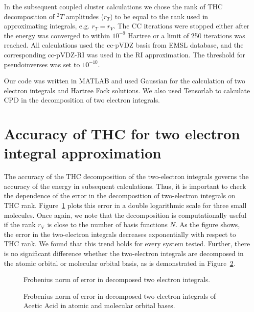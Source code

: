 In the subsequent coupled cluster calculations we chose the rank of THC 
decomposition of ${}^2T$ amplitudes ($r_{T}$) to be equal to the rank 
used in approximating integrals, e.g. $r_{T} = r_{V}$. 
The CC iterations were stopped either after the energy was converged to within 
$10^{-9}$ Hartree or a limit of 250 iterations 
was reached. All calculations used the cc-pVDZ basis from EMSL
database,\cite{schuchardt2007basis} and the corresponding cc-pVDZ-RI
was used in the RI approximation. The threshold for pseudoinverses was set to 
$10^{-10}$.

Our code was written in MATLAB\cite{matlab} and used Gaussian\cite{gaussian} 
for the calculation of two electron integrals and Hartree Fock solutions. We 
also used Tensorlab\cite{vervliettensorlab} to calculate CPD in the 
decomposition of two electron integrals.

\section{Accuracy of THC for two electron integral approximation}
The accuracy of the THC decomposition of the two-electron integrals governs the
accuracy of the energy in subsequent calculations. Thus, it is important to 
check the dependence of the error in the decomposition of
two-electron integrals on THC rank. Figure~\ref{fig:thc_err_mo_3systems} plots 
this error in a double logarithmic scale for three small molecules. Once again, 
we note that the decomposition is computationally useful if the rank 
$r_\mathrm{V}$ is close to the number of basis functions $N$.  As the figure 
shows, the error in the two-electron integrals decreases exponentially with
respect to THC rank. We found that this trend holds for every system
tested. Further, there is no significant difference whether the two-electron 
integrals are decomposed in the atomic orbital or molecular orbital basis, as 
is demonstrated in Figure~\ref{fig:thc_err_ao_vs_mo}.

%
\begin{figure}[tb]
\caption{Frobenius norm of error in decomposed two electron integrals.
\label{fig:thc_err_mo_3systems}}
\end{figure}
%
\begin{figure}[tb]
\caption{Frobenius norm of error in decomposed two electron integrals of Acetic 
Acid in atomic and molecular orbital bases.
\label{fig:thc_err_ao_vs_mo}}
\end{figure}
%

